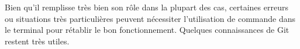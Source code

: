 \documentclass[11pt,a4paper]{article}
\begin{document}
%


Bien qu'il remplisse très bien son rôle dans la plupart des cas, certaines erreurs ou situations très particulières peuvent nécessiter l'utilisation de commande dans le terminal pour rétablir le bon fonctionnement.
Quelques connaissances de Git restent très utiles.
\end{document}
